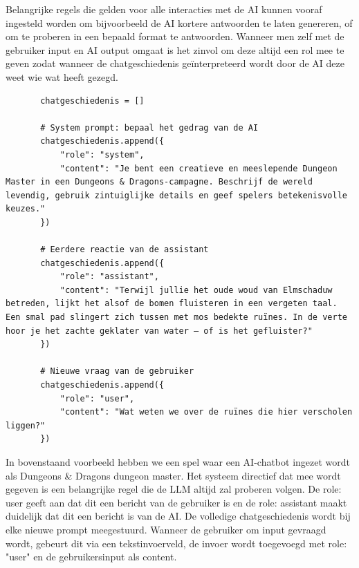 Belangrijke regels die gelden voor alle interacties met de AI kunnen vooraf ingesteld worden om bijvoorbeeld de AI kortere antwoorden te laten genereren, of om te proberen in een bepaald format te antwoorden. Wanneer men zelf met de gebruiker input en AI output omgaat is het zinvol om deze altijd een rol mee te geven zodat wanneer de chatgeschiedenis geïnterpreteerd wordt door de AI deze weet wie wat heeft gezegd.

\begin{listing}
    \begin{verbatim}
       chatgeschiedenis = []
       
       # System prompt: bepaal het gedrag van de AI
       chatgeschiedenis.append({
           "role": "system",
           "content": "Je bent een creatieve en meeslepende Dungeon Master in een Dungeons & Dragons-campagne. Beschrijf de wereld levendig, gebruik zintuiglijke details en geef spelers betekenisvolle keuzes."
       })
       
       # Eerdere reactie van de assistant
       chatgeschiedenis.append({
           "role": "assistant",
           "content": "Terwijl jullie het oude woud van Elmschaduw betreden, lijkt het alsof de bomen fluisteren in een vergeten taal. Een smal pad slingert zich tussen met mos bedekte ruïnes. In de verte hoor je het zachte geklater van water — of is het gefluister?"
       })
       
       # Nieuwe vraag van de gebruiker
       chatgeschiedenis.append({
           "role": "user",
           "content": "Wat weten we over de ruïnes die hier verscholen liggen?"
       })
    \end{verbatim}
    \caption[Chatgeschiedenis met bepaalde rollen]{Voorbeeld van een expliciete invulling van chatgeschiedenis in verschillende rollen.}
    \label{lst:dungeonsanddragonschatgeschiedenis}
\end{listing}

In bovenstaand voorbeeld hebben we een spel waar een AI-chatbot ingezet wordt als Dungeons \& Dragons dungeon master. Het systeem directief dat mee wordt gegeven is een belangrijke regel die de LLM altijd zal proberen volgen. De role: user geeft aan dat dit een bericht van de gebruiker is en de role: assistant maakt duidelijk dat dit een bericht is van de AI. De volledige chatgeschiedenis wordt bij elke nieuwe prompt meegestuurd. Wanneer de gebruiker om input gevraagd wordt, gebeurt dit via een tekstinvoerveld, de invoer wordt toegevoegd met role: "user" en de gebruikersinput als content. \\

